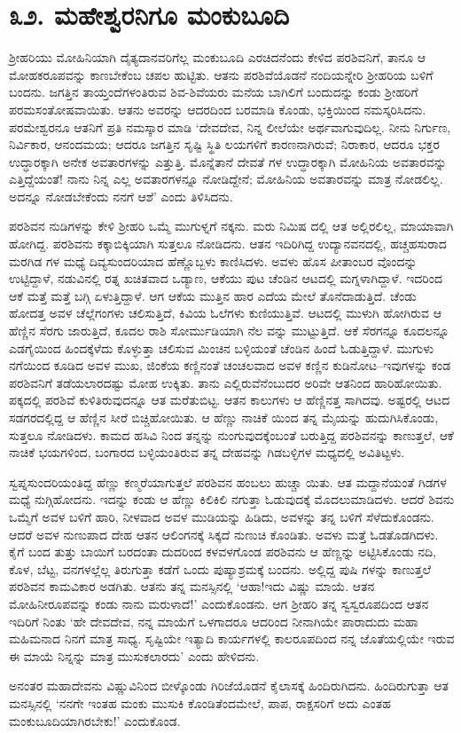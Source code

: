 
\chapter{೩೨. ಮಹೇಶ್ವರನಿಗೂ ಮಂಕುಬೂದಿ}

ಶ್ರೀಹರಿಯು ಮೋಹಿನಿಯಾಗಿ ದೈತ್ಯದಾನವರಿಗೆಲ್ಲ ಮಂಕುಬೂದಿ ಎರಚಿದನೆಂದು ಕೇಳಿದ ಪರಶಿವನಿಗೆ, ತಾನೂ ಆ ಮೋಹಕರೂಪವನ್ನು ಕಾಣಬೇಕೆಂಬ ಚಪಲ ಹುಟ್ಟಿತು. ಆತನು ಪರಶಿವೆಯೊಡನೆ ನಂದಿಯನ್ನೇರಿ ಶ್ರೀಹರಿಯ ಬಳಿಗೆ ಬಂದನು. ಜಗತ್ತಿನ ತಾಯ್ತಂದೆಗಳಂತಿರುವ ಶಿವ-ಶಿವೆಯರು ಮನೆಯ ಬಾಗಿಲಿಗೆ ಬಂದುದನ್ನು ಕಂಡು ಶ್ರೀಹರಿಗೆ ಪರಮಸಂತೋಷವಾಯಿತು. ಆತನು ಅವರನ್ನು ಆದರದಿಂದ ಬರಮಾಡಿ ಕೊಂಡು, ಭಕ್ತಿಯಿಂದ ನಮಸ್ಕರಿಸಿದನು. ಪರಮೇಶ್ವರನೂ ಆತನಿಗೆ ಪ್ರತಿ ನಮಸ್ಕಾರ ಮಾಡಿ ‘ದೇವದೇವ, ನಿನ್ನ ಲೀಲೆಯೇ ಅರ್ಥವಾಗುವುದಿಲ್ಲ. ನೀನು ನಿರ್ಗುಣ, ನಿರ್ವಿಕಾರ, ಆನಂದಮಯ; ಆದರೂ ಜಗತ್ತಿನ ಸೃಷ್ಟಿ ಸ್ಥಿತಿ ಲಯಗಳಿಗೆ ಕಾರಣನಾಗಿರುವೆ; ನಿರಾಕಾರ, ಆದರೂ ಭಕ್ತರ ಉದ್ಧಾರಕ್ಕಾಗಿ ಅನೇಕ ಅವತಾರಗಳನ್ನು ಎತ್ತುತ್ತಿ. ಮೊನ್ನೆತಾನೆ ದೇವತೆ ಗಳ ಉದ್ಧಾರಕ್ಕಾಗಿ ಮೋಹಿನಿಯ ಅವತಾರವನ್ನು ಎತ್ತಿದ್ದೆಯಂತೆ! ನಾನು ನಿನ್ನ ಎಲ್ಲ ಅವತಾರಗಳನ್ನೂ ನೋಡಿದ್ದೇನೆ; ಮೋಹಿನಿಯ ಅವತಾರವನ್ನು ಮಾತ್ರ ನೋಡಲಿಲ್ಲ. ಅದನ್ನೂ ನೋಡಬೇಕೆಂದು ನನಗೆ ಆಶೆ’ ಎಂದು ತಿಳಿಸಿದನು. 

ಪರಶಿವನ ನುಡಿಗಳನ್ನು ಕೇಳಿ ಶ್ರೀಹರಿ ಒಮ್ಮೆ ಮುಗುಳ್ನಗೆ ನಕ್ಕನು. ಮರು ನಿಮಿಷ ದಲ್ಲಿ ಆತ ಅಲ್ಲಿರಲಿಲ್ಲ, ಮಾಯಾವಾಗಿ ಹೋಗಿದ್ದ. ಪರಶಿವನು ಕಕ್ಕಾಬಿಕ್ಕಿಯಾಗಿ ಸುತ್ತಲೂ ನೋಡಿದನು. ಆತನ ಇದಿರಿಗಿದ್ದ ಉದ್ಯಾನವನದಲ್ಲಿ, ಹಚ್ಚಹಸುರಾದ ಮರಗಿಡ ಗಳ ಮಧ್ಯೆ ದಿವ್ಯಸುಂದರಿಯಾದ ಹೆಣ್ಣೊಬ್ಬಳು ಕಾಣಿಸಿದಳು. ಅವಳು ಹೊಸ ಪೀತಾಂಬರ ವೊಂದನ್ನು ಉಟ್ಟಿದ್ದಾಳೆ, ನಡುವಿನಲ್ಲಿ ರತ್ನ ಖಚಿತವಾದ ಒಡ್ಯಾಣ, ಆಕೆಯು ಪುಟ ಚೆಂಡಿನ ಆಟದಲ್ಲಿ ಮಗ್ನಳಾಗಿದ್ದಾಳೆ. ಇದರಿಂದ ಆಕೆ ಮತ್ತೆ ಮತ್ತೆ ಬಗ್ಗಿ ಏಳುತ್ತಿದ್ದಾಳೆ. ಆಗ ಆಕೆಯ ಮುತ್ತಿನ ಹಾರ ಎದೆಯ ಮೇಲೆ ತೊನೆದಾಡುತ್ತಿದೆ. ಚೆಂಡು ಹೋದತ್ತ ಅವಳ ಚೆಲ್ಲೆಗಂಗಳು ಚಲಿಸುತ್ತಿದೆ, ಕಿವಿಯ ಓಲೆಗಳು ಕುಣಿಯುತ್ತಿವೆ. ಆಟದಲ್ಲಿ ಮುಳುಗಿ ಹೋಗಿರುವ ಆ ಹೆಣ್ಣಿನ ಸೆರಗು ಜಾರುತ್ತಿದೆ, ಕೂದಲ ರಾಶಿ ಸೋರ್ಮುಡಿಯಾಗಿ ನೆಲ ವನ್ನು ಮುಟ್ಟುತ್ತಿದೆ. ಆಕೆ ಸೆರಗನ್ನೂ ಕೂದಲನ್ನೂ ಎಡಗೈಯಿಂದ ಹಿಂದಕ್ಕೆಳೆದು ಕೊಳ್ಳುತ್ತಾ ಚಲಿಸುವ ಮಿಂಚಿನ ಬಳ್ಳಿಯಂತೆ ಚೆಂಡಿನ ಹಿಂದೆ ಓಡುತ್ತಿದ್ದಾಳೆ. ಮುಗುಳು ನಗೆಯಿಂದ ಕೂಡಿದ ಅವಳ ಮುಖ, ಜಿಂಕೆಯ ಕಣ್ಣಿನಂತೆ ಚಂಚಲವಾದ ಅವಳ ಕಣ್ಣಿನ ಕುಡಿನೋಟ–ಇವುಗಳನ್ನು ಕಂಡ ಪರಶಿವನಿಗೆ ತಡೆಯಲಾರದಷ್ಟು ಮೋಹ ಉಕ್ಕಿತು. ತಾನು ಎಲ್ಲಿರುವೆನೆಂಬುದರ ಅರಿವೇ ಆತನಿಂದ ಹಾರಿಹೋಯಿತು. ಪಕ್ಕದಲ್ಲಿ ಪರಶಿವೆ ಕುಳಿತಿರುವುದನ್ನೂ ಆತ ಮರೆತುಬಿಟ್ಟ. ಆತನ ಕಾಲುಗಳು ಆ ಹೆಣ್ಣಿನತ್ತ ಸಾಗಿದವು. ಅಷ್ಟರಲ್ಲಿ ಆಟದ ಸಡಗರದಲ್ಲಿದ್ದ ಆ ಹೆಣ್ಣಿನ ಸೀರೆ ಬಿಚ್ಚಿಹೋಯಿತು. ಆ ಹೆಣ್ಣು ನಾಚಿಕೆ ಯಿಂದ ತನ್ನ ಮೈಯನ್ನು ಹುದುಗಿಸಿಕೊಂಡು, ಸುತ್ತಲೂ ನೋಡಿದಳು. ಕಾಮದ ಹಸಿವಿ ನಿಂದ ತನ್ನನ್ನು ನುಂಗುವುದಕ್ಕೆಂಬಂತೆ ಬರುತ್ತಿದ್ದ ಪರಶಿವನನ್ನು ಕಾಣುತ್ತಲೆ, ಆಕೆ ನಾಚಿಕೆ ಭಯಗಳಿಂದ, ಬಂಗಾರದ ಬಳ್ಳಿಯಂತಿರುವ ತನ್ನ ದೇಹವನ್ನು ಗಿಡಬಳ್ಳಿಗಳ ಮಧ್ಯದಲ್ಲಿ ಅವಿತಿಟ್ಟಳು. 

ಸ್ವಪ್ನಸುಂದರಿಯಂತಿದ್ದ ಹೆಣ್ಣು ಕಣ್ಮರೆಯಾಗುತ್ತಲೆ ಪರಶಿವನ ಹಂಬಲು ಹುಚ್ಚಾ ಯಿತು. ಆತ ಮದ್ದಾನೆಯಂತೆ ಗಿಡಗಳ ಮಧ್ಯೆ ನುಗ್ಗಿಹೋದನು. ಇದನ್ನು ಕಂಡು ಆ ಹೆಣ್ಣು ಕಿಲಿಕಿಲಿ ನಗುತ್ತಾ ಓಡುವುದಕ್ಕೆ ಮೊದಲುಮಾಡಿದಳು. ಆದರೆ ಶಿವನು ಒಮ್ಮೆಗೆ ಅವಳ ಬಳಿಗೆ ಹಾರಿ, ನೀಳವಾದ ಅವಳ ಮುಡಿಯನ್ನು ಹಿಡಿದು, ಅವಳನ್ನು ತನ್ನ ಬಳಿಗೆ ಸೆಳೆದುಕೊಂಡನು. ಆದರೆ ಅವಳ ನುಣುಪಾದ ದೇಹ ಆತನ ಆಲಿಂಗನಕ್ಕೆ ಸಿಕ್ಕದೆ ನುಣುಚಿ ಕೊಂಡಿತು. ಅವಳು ಮತ್ತೆ ಓಡತೊಡಗಿದಳು. ಕೈಗೆ ಬಂದ ತುತ್ತು ಬಾಯಿಗೆ ಬರದಂತಾ ದುದರಿಂದ ಕಳವಳಗೊಂಡ ಪರಶಿವನು ಆ ಹೆಣ್ಣನ್ನು ಅಟ್ಟಿಸಿಕೊಂಡು ನದಿ, ಕೊಳ, ಬೆಟ್ಟ, ವನಗಳಲ್ಲೆಲ್ಲ ತಿರುಗುತ್ತಾ ಕಡೆಗೆ ಒಂದು ಪುಷ್ಯಾಶ್ರಮಕ್ಕೆ ಬಂದನು. ಅಲ್ಲಿದ್ದ ಪುಷಿ ಗಳನ್ನು ಕಾಣುತ್ತಲೆ ಪರಶಿವನ ಕಾಮವಿಕಾರ ಅಡಗಿತು. ಆತನು ತನ್ನ ಮನಸ್ಸಿನಲ್ಲಿ ‘ಆಹಾ!ಇದು ವಿಷ್ಣು ಮಾಯೆ. ಆತನ ಮೋಹಿನೀರೂಪವನ್ನು ಕಂಡು ನಾನು ಮರುಳಾದೆ!’ ಎಂದುಕೊಂಡನು. ಆಗ ಶ್ರೀಹರಿ ತನ್ನ ಸ್ವಸ್ವರೂಪದಿಂದ ಆತನ ಇದಿರಿಗೆ ನಿಂತು ‘ಹೇ ದೇವದೇವ, ನನ್ನ ಮಾಯೆಗೆ ಒಳಗಾದರೂ ಆದರಿಂದ ನೀನಾಗಿಯೇ ಪಾರಾದುದು ಮಹಾ ಮಹಿಮನಾದ ನಿನಗೆ ಮಾತ್ರ ಸಾಧ್ಯ. ಸೃಷ್ಟಿಯೇ ಇತ್ಯಾದಿ ಕಾರ್ಯಗಳಲ್ಲಿ ಕಾಲರೂಪದಿಂದ ನನ್ನ ಜೊತೆಯಲ್ಲಿಯೇ ಇರುವ ಈ ಮಾಯೆ ನಿನ್ನನ್ನು ಮಾತ್ರ ಮುಸುಕಲಾರದು’ ಎಂದು ಹೇಳಿದನು. 

ಅನಂತರ ಮಹಾದೇವನು ವಿಷ್ಣುವಿನಿಂದ ಬೀಳ್ಕೊಂಡು ಗಿರಿಜೆಯೊಡನೆ ಕೈಲಾಸಕ್ಕೆ ಹಿಂದಿರುಗಿದನು. ಹಿಂದಿರುಗುತ್ತಾ ಆತ ಮನಸ್ಸಿನಲ್ಲಿ ‘ನನಗೇ ಇಂತಹ ಮಂಕು ಮುಸುಕಿ ಕೊಂಡಿತೆಂದಮೇಲೆ, ಪಾಪ, ರಾಕ್ಷಸರಿಗೆ ಅದು ಎಂತಹ ಮಂಕುಬೂದಿಯಾಗಿರಬೇಕು!’ ಎಂದುಕೊಂಡ.


